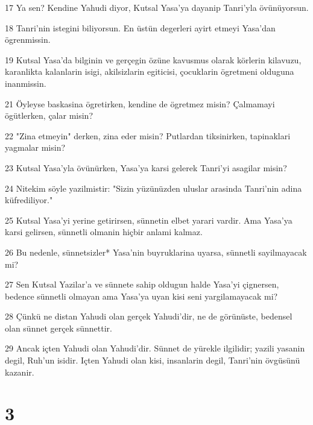\par 17 Ya sen? Kendine Yahudi diyor, Kutsal Yasa'ya dayanip Tanri'yla övünüyorsun.
\par 18 Tanri'nin istegini biliyorsun. En üstün degerleri ayirt etmeyi Yasa'dan ögrenmissin.
\par 19 Kutsal Yasa'da bilginin ve gerçegin özüne kavusmus olarak körlerin kilavuzu, karanlikta kalanlarin isigi, akilsizlarin egiticisi, çocuklarin ögretmeni olduguna inanmissin.
\par 21 Öyleyse baskasina ögretirken, kendine de ögretmez misin? Çalmamayi ögütlerken, çalar misin?
\par 22 "Zina etmeyin" derken, zina eder misin? Putlardan tiksinirken, tapinaklari yagmalar misin?
\par 23 Kutsal Yasa'yla övünürken, Yasa'ya karsi gelerek Tanri'yi asagilar misin?
\par 24 Nitekim söyle yazilmistir: "Sizin yüzünüzden uluslar arasinda Tanri'nin adina küfrediliyor."
\par 25 Kutsal Yasa'yi yerine getirirsen, sünnetin elbet yarari vardir. Ama Yasa'ya karsi gelirsen, sünnetli olmanin hiçbir anlami kalmaz.
\par 26 Bu nedenle, sünnetsizler* Yasa'nin buyruklarina uyarsa, sünnetli sayilmayacak mi?
\par 27 Sen Kutsal Yazilar'a ve sünnete sahip oldugun halde Yasa'yi çignersen, bedence sünnetli olmayan ama Yasa'ya uyan kisi seni yargilamayacak mi?
\par 28 Çünkü ne distan Yahudi olan gerçek Yahudi'dir, ne de görünüste, bedensel olan sünnet gerçek sünnettir.
\par 29 Ancak içten Yahudi olan Yahudi'dir. Sünnet de yürekle ilgilidir; yazili yasanin degil, Ruh'un isidir. Içten Yahudi olan kisi, insanlarin degil, Tanri'nin övgüsünü kazanir.

\chapter{3}

